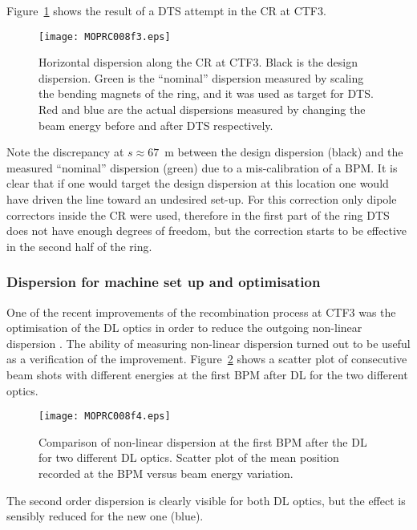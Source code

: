 Figure~\ref{fig:CRDTS} shows the result of a DTS attempt in the CR at CTF3.
%
\begin{figure}[!htb]
   \centering
   \texttt{[image: MOPRC008f3.eps]}
   \caption{Horizontal dispersion along the CR at CTF3.
   Black is the design dispersion.
   Green is the ``nominal'' dispersion measured by scaling the bending magnets of the ring, and it was used as target for DTS.
   Red and blue are the actual dispersions measured by changing the beam energy before and after DTS respectively.}
   \label{fig:CRDTS}
\end{figure}
%
Note the discrepancy at $s \approx 67$~m between the design dispersion (black) and 
the measured ``nominal'' dispersion (green) due to a mis-calibration of a BPM. 
It is clear that if one would target the design dispersion at this location 
one would have driven the line toward an undesired set-up.
For this correction only dipole correctors inside the CR were used, 
therefore in the first part of the ring DTS does not have enough degrees of freedom,
but the correction starts to be effective in the second half of the ring.


\subsubsection{Dispersion for machine set up and optimisation}
%
One of the recent improvements of the recombination process at CTF3 was 
the optimisation of the DL optics in order to reduce the outgoing non-linear dispersion \cite{gambaIPAC16}.
The ability of measuring non-linear dispersion turned out to be useful as a verification of the improvement.
Figure~\ref{fig:DLnewOptics} shows a scatter plot of consecutive beam shots with different energies at 
the first BPM after DL for the two different optics.
%
\begin{figure}[!htb]
   \centering
   \texttt{[image: MOPRC008f4.eps]}
   \caption{Comparison of non-linear dispersion at the first BPM after the DL for two different DL optics.
   Scatter plot of the mean position recorded at the BPM versus beam energy variation.}
   \label{fig:DLnewOptics}
\end{figure}
The second order dispersion is clearly visible for both DL optics, but the effect is sensibly reduced for the new one (blue).

